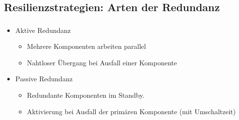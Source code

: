 \subsection{Resilienzstrategien: Arten der Redundanz}
\begin{frame}
    \frametitle{\insertsection}
    \framesubtitle{\insertsubsection}
        \begin{itemize}
            \item Aktive Redundanz
                \begin{itemize}
                    \item Mehrere Komponenten arbeiten parallel
                    \item Nahtloser Übergang bei Ausfall einer Komponente
                \end{itemize}
            \item Passive Redundanz
                \begin{itemize}
                    \item Redundante Komponenten im Standby.
                    \item Aktivierung bei Ausfall der primären Komponente (mit Umschaltzeit)
                \end{itemize}
        \end{itemize}


\end{frame}


